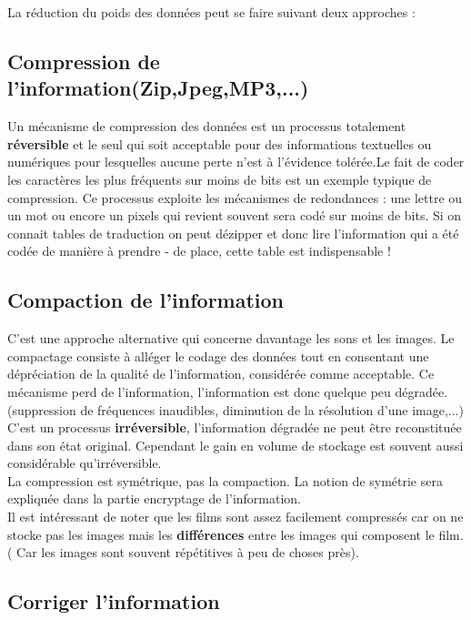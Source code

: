 \documentclass{report}
\begin{document}
La réduction du poids des données peut se faire suivant deux approches :\\

\subsection{Compression de l'information(Zip,Jpeg,MP3,...)} 
Un mécanisme de compression des données est un processus totalement {\bf réversible} et le seul qui soit acceptable pour des informations textuelles ou numériques pour lesquelles aucune perte n'est à l'évidence tolérée.Le fait de coder les caractères les plus fréquents sur moins de bits est un exemple typique de compression. Ce processus exploite les mécanismes de redondances : une lettre ou un mot ou encore un pixels qui revient souvent sera codé sur moins de bits. Si on connait tables de traduction on peut dézipper et donc lire l'information qui a été codée de manière à prendre - de place, cette table est indispensable !

\subsection{ Compaction de l'information}

C'est une approche alternative qui concerne davantage les sons et les images. Le compactage consiste à alléger le codage des données tout en consentant une dépréciation de la qualité de l'information, considérée comme acceptable.
Ce mécanisme perd de l'information, l'information est donc quelque peu dégradée. (suppression de fréquences inaudibles, diminution de la résolution d'une image,...) C'est un processus {\bf irréversible}, l'information dégradée ne peut être reconstituée dans son état original. Cependant le gain en volume de stockage est souvent aussi considérable qu'irréversible.\\
La compression est symétrique, pas la compaction. La notion de symétrie sera expliquée dans la partie encryptage de l'information.\\


Il est intéressant de noter que les films sont assez facilement compressés car on ne stocke pas les images mais les {\bf différences} entre les images qui composent le film. ( Car les images sont souvent répétitives à peu de choses près).\\

\subsection{Corriger l'information}
\end{document}
